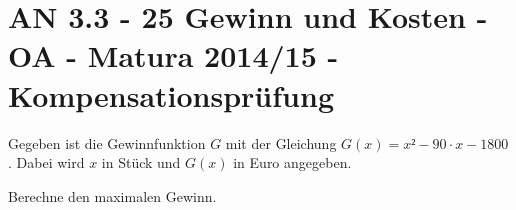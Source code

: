 \section{AN 3.3 - 25 Gewinn und Kosten - OA - Matura 2014/15 - Kompensationsprüfung}

\begin{beispiel}[AN 3.3]{1} %
				Gegeben ist die Gewinnfunktion $G$ mit der Gleichung $G(x)=x²-90\cdot x-1800$. Dabei wird $x$ in Stück und $G(x)$ in Euro angegeben.
				
				Berechne den maximalen Gewinn.\\
				
\end{beispiel}